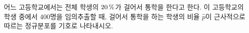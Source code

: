 어느 고등학교에서는 전체 학생의 $20\mkern3mu \%$가 걸어서 통학을 한다고 한다. 이 고등학교의 학생 중에서 $400$명을 임의추출할 때, 걸어서 통학을 하는 학생의 비율 $\hat{p}$이 근사적으로 따르는 정규분포를 기호로 나타내시오.
